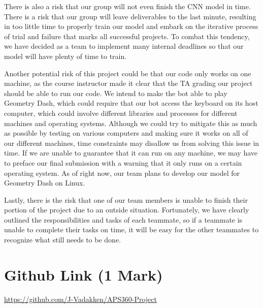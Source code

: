 \documentclass{article} %
\begin{document}
There is also a risk that our group will not even finish the CNN model 
in time. There is a risk that our group will leave deliverables to the 
last minute, resulting in too little time to properly train our model 
and embark on the iterative process of trial and failure that marks all
successful projects. To combat this tendency, we have decided as a team 
to implement many internal deadlines so that our model will have plenty 
of time to train.

Another potential risk of this project could be that our code only works
on one machine, as the course instructor made it clear that the TA grading
our project should be able to run our code. We intend to make the bot 
able to play Geometry Dash, which could require that our bot access the 
keyboard on its host computer, which could involve different libraries 
and processes for different machines and operating systems. Although 
we could try to mitigate this as much as possible by testing on various 
computers and making sure it works on all of our different machines, time
constraints may disallow us from solving this issue in time. If we are 
unable to guarantee that it can run on any machine, we may have to preface 
our final submission with a warning that it only runs on a certain 
operating system. As of right now, our team plans to develop our model 
for Geometry Dash on Linux. 

Lastly, there is the risk that one of our team members is unable to finish
their portion of the project due to an outside situation. Fortunately, 
we have clearly outlined the responsibilities and tasks of each teammate, 
so if a teammate is unable to complete their tasks on time, it will be 
easy for the other teammates to recognize what still needs to be done.


\section{Github Link (1 Mark)}
\href{https://github.com/J-Vadakken/APS360-Project}{https://github.com/J-Vadakken/APS360-Project}

\label{last_page}



\end{document}
